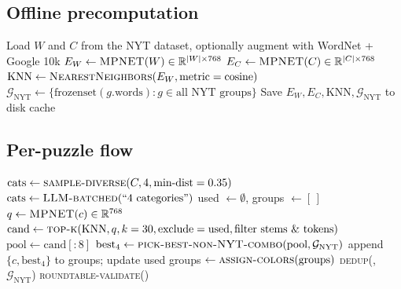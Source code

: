 \documentclass[11pt, letterpaper]{article}
\begin{document}
\subsection{Offline precomputation}
\begin{algorithm}[H]
\caption{CFR --- Offline precomputation (runs once, $\sim$5 minutes)}
\begin{algorithmic}[1]
\State Load $W$ and $C$ from the NYT dataset, optionally augment with WordNet + Google 10k
\State $E_W \gets \textsc{MPNET}(W) \in \mathbb{R}^{|W| \times 768}$
\State $E_C \gets \textsc{MPNET}(C) \in \mathbb{R}^{|C| \times 768}$
\State $\text{KNN} \gets \textsc{NearestNeighbors}(E_W, \text{metric}=\text{cosine})$
\State $\mathcal{G}_\text{NYT} \gets \{\text{frozenset}(g.\text{words}) : g \in \text{all NYT groups}\}$
\State Save $E_W, E_C, \text{KNN}, \mathcal{G}_\text{NYT}$ to disk cache
\end{algorithmic}
\end{algorithm}

\subsection{Per-puzzle flow}

\begin{algorithm}[H]
\caption{CFR --- Online generation (per puzzle)}
\begin{algorithmic}[1]
\State {}
    \State $\text{cats} \gets \textsc{sample-diverse}(C, 4, \text{min-dist}=0.35)$ 
    \State $\text{cats} \gets \textsc{LLM-batched}(\text{``4 categories''})$ 
\EndIf
\State used $\gets \emptyset$, groups $\gets [\,]$
    \State $q \gets \textsc{MPNET}(c) \in \mathbb{R}^{768}$ 
    \State $\text{cand} \gets \textsc{top-k}(\text{KNN}, q, k=30, \text{exclude}=\text{used}, \text{filter stems \& tokens})$
    \State $\text{pool} \gets \text{cand}[:8]$
    \State $\text{best}_4 \gets \textsc{pick-best-non-NYT-combo}(\text{pool}, \mathcal{G}_\text{NYT})$ 
    \State append $\{c, \text{best}_4\}$ to groups; update used
\EndFor
\State groups $\gets \textsc{assign-colors}(\text{groups})$ 
\State \textsc{dedup}(, $\mathcal{G}_\text{NYT}$) 
\State \textsc{roundtable-validate}() 
\end{algorithmic}
\end{algorithm}
\end{document}
